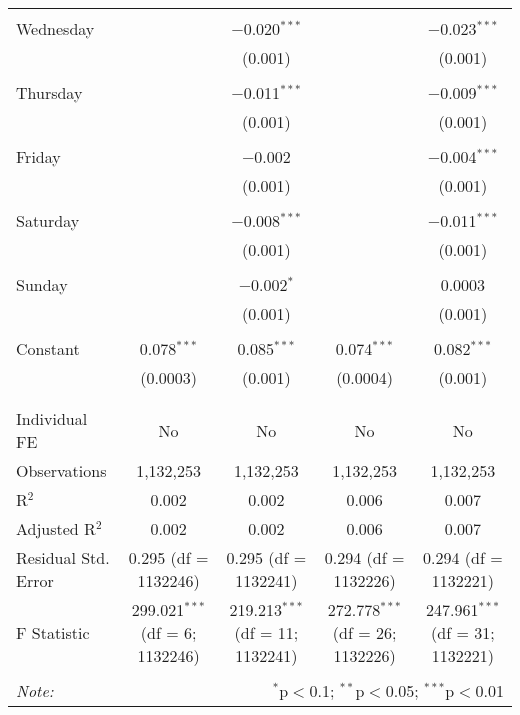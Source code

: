 \documentclass[
]{article}
\begin{document}
\begin{table}[!htbp]
{\begin{tabular}{@{\extracolsep{5pt}}lcccc}
  & & & & \\ 
 Wednesday &  & $-$0.020$^{***}$ &  & $-$0.023$^{***}$ \\ 
  &  & (0.001) &  & (0.001) \\ 
  & & & & \\ 
 Thursday &  & $-$0.011$^{***}$ &  & $-$0.009$^{***}$ \\ 
  &  & (0.001) &  & (0.001) \\ 
  & & & & \\ 
 Friday &  & $-$0.002 &  & $-$0.004$^{***}$ \\ 
  &  & (0.001) &  & (0.001) \\ 
  & & & & \\ 
 Saturday &  & $-$0.008$^{***}$ &  & $-$0.011$^{***}$ \\ 
  &  & (0.001) &  & (0.001) \\ 
  & & & & \\ 
 Sunday &  & $-$0.002$^{*}$ &  & 0.0003 \\ 
  &  & (0.001) &  & (0.001) \\ 
  & & & & \\ 
 Constant & 0.078$^{***}$ & 0.085$^{***}$ & 0.074$^{***}$ & 0.082$^{***}$ \\ 
  & (0.0003) & (0.001) & (0.0004) & (0.001) \\ 
  & & & & \\ 
\hline \\[-1.8ex] 
Individual FE & No & No & No & No \\ 
Observations & 1,132,253 & 1,132,253 & 1,132,253 & 1,132,253 \\ 
R$^{2}$ & 0.002 & 0.002 & 0.006 & 0.007 \\ 
Adjusted R$^{2}$ & 0.002 & 0.002 & 0.006 & 0.007 \\ 
Residual Std. Error & 0.295 (df = 1132246) & 0.295 (df = 1132241) & 0.294 (df = 1132226) & 0.294 (df = 1132221) \\ 
F Statistic & 299.021$^{***}$ (df = 6; 1132246) & 219.213$^{***}$ (df = 11; 1132241) & 272.778$^{***}$ (df = 26; 1132226) & 247.961$^{***}$ (df = 31; 1132221) \\ 
\hline 
\hline \\[-1.8ex] 
\textit{Note:}  & \multicolumn{4}{r}{$^{*}$p$<$0.1; $^{**}$p$<$0.05; $^{***}$p$<$0.01} \\ 
\end{tabular}
} 
\end{table} 
\newpage
\end{document}
